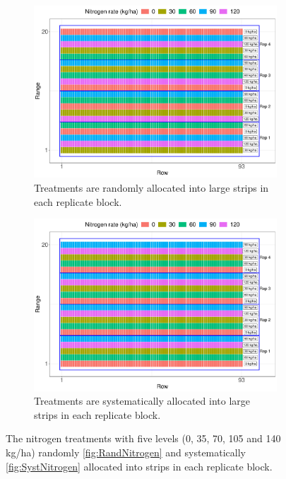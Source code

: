 \documentclass[a4paper]{article} 	%
\begin{document}
\begin{figure}[!htp]
	\begin{subfigure}[t]{0.45\textwidth}
		\centering
		\includegraphics[width=\linewidth]{Col_RandNitro.pdf}
		\caption{Treatments are randomly allocated into large strips in each replicate block.}\label{fig:RandNitrogen}
	\end{subfigure}
	\hspace{0.05\textwidth}
	\begin{subfigure}[t]{0.45\textwidth}
		\centering
		\includegraphics[width=\linewidth]{Col_SystNitro.pdf}
		\caption{Treatments are systematically allocated into large strips in each replicate block.}\label{fig:SystNitrogen}
	\end{subfigure}
	\caption{The nitrogen treatments with five levels (0, 35, 70, 105 and 140 kg/ha) randomly \eqref{fig:RandNitrogen} and systematically \eqref{fig:SystNitrogen} allocated into strips in each replicate block.}\label{fig:Nitrogen}
\end{figure}
\end{document}
